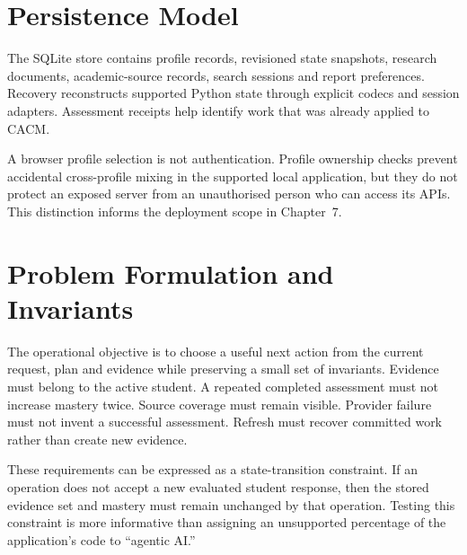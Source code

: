 \section{Persistence Model}
The SQLite store contains profile records, revisioned state snapshots, research documents, academic-source records, search sessions and report preferences. Recovery reconstructs supported Python state through explicit codecs and session adapters. Assessment receipts help identify work that was already applied to CACM.

A browser profile selection is not authentication. Profile ownership checks prevent accidental cross-profile mixing in the supported local application, but they do not protect an exposed server from an unauthorised person who can access its APIs. This distinction informs the deployment scope in Chapter~7.

\section{Problem Formulation and Invariants}
The operational objective is to choose a useful next action from the current request, plan and evidence while preserving a small set of invariants. Evidence must belong to the active student. A repeated completed assessment must not increase mastery twice. Source coverage must remain visible. Provider failure must not invent a successful assessment. Refresh must recover committed work rather than create new evidence.

These requirements can be expressed as a state-transition constraint. If an operation does not accept a new evaluated student response, then the stored evidence set and mastery must remain unchanged by that operation. Testing this constraint is more informative than assigning an unsupported percentage of the application's code to ``agentic AI.''
